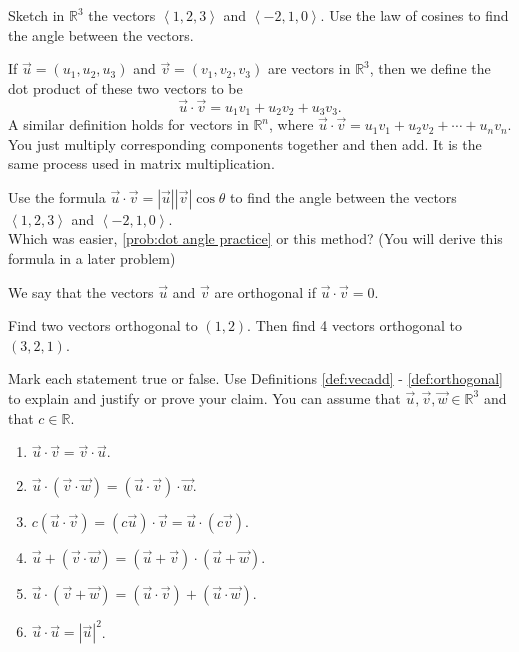\begin{problem}\label{dot angle practice}  
%
Sketch in $\mathbb{R}^3$ the vectors $\left<1,2,3\right>$ and $\left<-2,1,0\right>$.  Use the law of cosines to find the angle between the vectors.
\end{problem}

\begin{definition}
If $\vec u = (u_1,u_2,u_3)$ and $\vec v= (v_1,v_2,v_3)$ are vectors in $\mathbb{R}^3$, then we define the dot product of these two vectors to be 
$$\vec u\cdot \vec v = u_1 v_1+ u_2 v_2+ u_3 v_3.$$
A similar definition holds for vectors in $\mathbb{R}^n$, where
$\vec u\cdot \vec v = u_1 v_1+ u_2 v_2+\cdots+ u_n v_n.$
You just multiply corresponding components together and then add. It is the same process used in matrix multiplication.
\end{definition}

\begin{problem}\label{prob:dot angle practice2}
Use the formula $\vec u\cdot \vec v=|\vec u||\vec v|\cos\theta$ to find the angle between the vectors $\left<1,2,3\right>$ and $\left<-2,1,0\right>$. \\

Which was easier, \ref{prob:dot angle practice} or this method?  (You will derive this formula in a later problem)
\end{problem}

\begin{definition}\label{def:orthogonal}
We say that the vectors $\vec u$ and $\vec v$ are orthogonal if $\vec u\cdot \vec v=0$. 
\end{definition}

\begin{problem}
Find two vectors orthogonal to $(1,2)$.  Then find 4 vectors orthogonal to $(3,2,1)$.  
\end{problem}

\begin{problem}\label{dot product facts}
Mark each statement true or false. Use Definitions \ref{def:vecadd} - \ref{def:orthogonal} to explain and justify or prove your claim. You can assume that $\vec u,\vec v,\vec w\in\mathbb{R}^3$ and that $c\in\mathbb{R}$.
\begin{enumerate}
\item $\vec u\cdot \vec v=\vec v\cdot \vec u$. 
\item $\vec u\cdot (\vec v\cdot \vec w)=(\vec u\cdot\vec v)\cdot\vec w$. 
\item $c(\vec u\cdot \vec v)=(c\vec u)\cdot \vec v=\vec u\cdot (c\vec v)$. 
\item $\vec u+(\vec v\cdot \vec w)=(\vec u+\vec v)\cdot(\vec u+\vec w)$. 
\item $\vec u\cdot (\vec v+ \vec w)=(\vec u\cdot \vec v)+(\vec u\cdot\vec w)$. 
\item $\vec u\cdot \vec u= |\vec u|^2$. 
\end{enumerate}
\end{problem}

